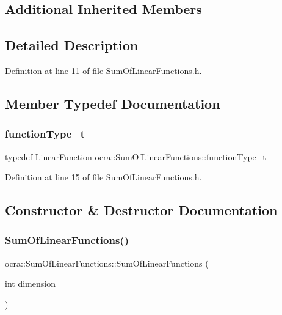 \subsection*{Additional Inherited Members}


\subsection{Detailed Description}


Definition at line 11 of file Sum\+Of\+Linear\+Functions.\+h.



\subsection{Member Typedef Documentation}
\hypertarget{classocra_1_1SumOfLinearFunctions_ae7f2c949cbda9d69d13e64e5bfeb5fa9}{}\label{classocra_1_1SumOfLinearFunctions_ae7f2c949cbda9d69d13e64e5bfeb5fa9} 
\subsubsection{\texorpdfstring{function\+Type\+\_\+t}{functionType\_t}}
{\footnotesize\ttfamily typedef \hyperlink{classocra_1_1LinearFunction}{Linear\+Function} \hyperlink{classocra_1_1SumOfLinearFunctions_ae7f2c949cbda9d69d13e64e5bfeb5fa9}{ocra\+::\+Sum\+Of\+Linear\+Functions\+::function\+Type\+\_\+t}}



Definition at line 15 of file Sum\+Of\+Linear\+Functions.\+h.



\subsection{Constructor \& Destructor Documentation}
\hypertarget{classocra_1_1SumOfLinearFunctions_a70b277cb77618691688b7b6151ec126d}{}\label{classocra_1_1SumOfLinearFunctions_a70b277cb77618691688b7b6151ec126d} 
\subsubsection{\texorpdfstring{Sum\+Of\+Linear\+Functions()}{SumOfLinearFunctions()}}
{\footnotesize\ttfamily ocra\+::\+Sum\+Of\+Linear\+Functions\+::\+Sum\+Of\+Linear\+Functions (\begin{DoxyParamCaption}\item[{int}]{dimension }\end{DoxyParamCaption})}



